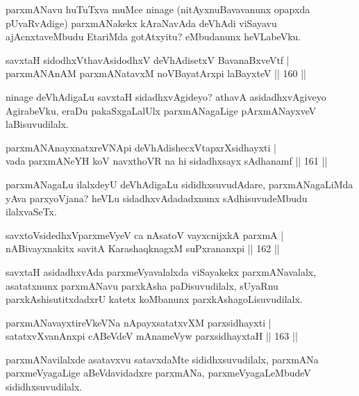\begin{artha}
parxmANavu huTuTxva muMce ninage (nitAyxnuBavavanunx opapxda pUvaRvAdige) parxmANakekx kAraNavAda deVhAdi viSayavu ajAcnxtaveMbudu EtariMda gotAtxyitu? eMbudanunx heVLabeVku.
\end{artha}

\begin{shl}
savxtaH sidodhxV\s thavA\s sidodhxV deVhAdisetxV BavanaBxveVtf |  \\
parxmANAnAM parxmANatavxM noVBayatArxpi laBayxteV \hfill||  160 ||  
\end{shl}

\begin{artha}
ninage deVhAdigaLu savxtaH sidadhxvAgideyo? athavA asidadhxvAgiveyo AgirabeVku, eraDu pakaSxgaLalUlx parxmANagaLige pArxmANayxveV laBisuvudilalx.
\end{artha}

\begin{shl}
parxmANAnayxnatxreVNApi deVhAdishecxVtapxrXsidhayxti | \\
vada parxmANeYH koV navxthoVR na hi sidadhxsayx sAdhanamf \hfill||  161 ||  
\end{shl}

\begin{artha}
parxmANagaLu ilalxdeyU deVhAdigaLu sididhxsuvudAdare, parxmANagaLiMda yAva parxyoVjana? heVLu sidadhxvAdadadxnunx sAdhisuvudeMbudu ilalxvaSeTx.
\end{artha}

\begin{shl}
savxtoV\s sidedhxV\s parxmeVyeV ca nAsatoV vayxcnijxkA parxmA | \\
nABivayxnakitx savitA KarashaqknagxM suPxrananxpi \hfill||  162 ||  
\end{shl}

\begin{artha}
savxtaH asidadhxvAda parxmeVyavalalxda viSayakekx parxmANavalalx, asatatxnunx parxmANavu parxkAsha paDisuvudilalx, sUyaRnu parxkAshisutitxdadxrU katetx koMbanunx parxkAshagoLisuvudilalx.
\end{artha}

\begin{shl}
parxmANavayxtireVkeVNa nApayxsatatxvXM parxsidhayxti | \\
satatxvXvanAnxpi cABeVdeV mAnameVyw parxsidhayxtaH \hfill||  163 ||  
\end{shl}

\begin{artha}
parxmANavilalxde asatavxvu satavxdaMte sididhxsuvudilalx, parxmANa parxmeVyagaLige aBeVdavidadxre parxmANa, parxmeVyagaLeMbudeV sididhxsuvudilalx.
\end{artha}

